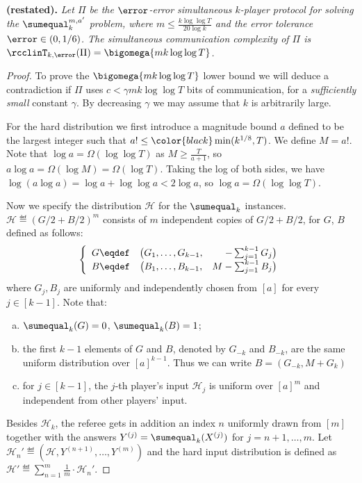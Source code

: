 \noindent\textbf{ (restated).} 
{\it
	Let $\Pi$ be the $\error$-error simultaneous $k$-player protocol for solving the $\sumequal_k^{m,a'}$ problem, where 
	$m \le\frac{k\log\log T}{20\log k}$ and the error tolerance $\error \in (0,1/6)$.
	The simultaneous communication complexity of $\Pi$ is $\rcclinT_{k,\error}(\Pi)=\bigomega{mk\log\log T}$.
}
\medskip
\begin{proof}
	To prove the $\bigomega{mk\log\log T}$ lower bound we will deduce a contradiction if $\Pi$ uses $c<\gamma mk\log\log T$ bits of communication, for a \emph{sufficiently small} constant $\gamma$.
	By decreasing $\gamma$ we may assume that $k$ is arbitrarily large.

	For the hard distribution we first introduce a magnitude bound $a$ defined to be the largest integer such that $a! \le {\color{black}\min(k^{1/8},T)}$. We define $M = a!$. {\color{black}Note that $\log a = \Omega(\log\log T)$ as $M \ge \frac{T}{a+1}$, so $a \log a = \Omega(\log M) = \Omega(\log T)$. Taking the log of both sides, we have $\log(a \log a) = \log a + \log \log a < 2\log a$, so $\log a = \Omega(\log \log T)$.}


	Now we specify the distribution $\mathcal{H}$ for the $\sumequal_k$ instances.
	$\mathcal{H} \eqdef \left(G/2+B/2\right)^m$ consists of $m$ independent copies of $G/2+B/2$,
	for $G$, $B$ defined as follows:
	$$
		\left\{
		\begin{array}{c c r}
			G \eqdef &	\big( G_1,\dots, G_{k-1} , &-\sum_{j=1}^{k-1} G_j \big)		\\
			B \eqdef &  \big( B_1,\dots, B_{k-1} , &M-\sum_{j=1}^{k-1} B_j \big)
		\end{array}		
		\right.
	$$
	where $G_j,B_j$ are uniformly and independently chosen from $[a]$ for every $j\in[k-1]$. 
	Note that:
	{\color{black}
	\begin{enumerate}[(a)]
	    \item $\sumequal_{k}(G)=0$, $\sumequal_{k}(B)=1$; 
	    \item the first $k-1$ elements of $G$ and $B$, denoted by $G_{-k}$ and $B_{-k}$, are the same uniform distribution over $[a]^{k-1}$. Thus we can write $B=(G_{-k},M+G_k)$
	    \item for $j\in[k-1]$, the $j$-th player's input $\mathcal{H}_j$ is uniform over $[a]^m$ and independent from other players' input.
	\end{enumerate}
}
	Besides $\mathcal{H}_k$, the referee gets in addition an index $n$ uniformly drawn from $[m]$ together with the answers $Y^{(j)}=\sumequal_k(X^{(j)})$ for $j=n+1,\ldots,m$.
	Let $\mathcal{H}_n'\eqdef (\mathcal{H},Y^{(n+1)},\ldots,Y^{(m)})$
	and the hard input distribution is defined as $\mathcal{H}'\eqdef %
	\sum_{n=1}^m \frac{1}{m}\cdot \mathcal{H}_n'$.
	


\end{proof}
